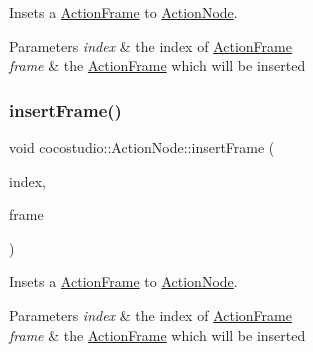 Insets a \hyperlink{classcocostudio_1_1ActionFrame}{Action\+Frame} to \hyperlink{classcocostudio_1_1ActionNode}{Action\+Node}.


\begin{DoxyParams}{Parameters}
{\em index} & the index of \hyperlink{classcocostudio_1_1ActionFrame}{Action\+Frame}\\
\hline
{\em frame} & the \hyperlink{classcocostudio_1_1ActionFrame}{Action\+Frame} which will be inserted \\
\hline
\end{DoxyParams}
\mbox{\label{classcocostudio_1_1ActionNode_a878d16c3aee4203fddf6891f90f9bc8d}} 
\subsubsection{\texorpdfstring{insert\+Frame()}{insertFrame()}\hspace{0.1cm}{\footnotesize\ttfamily [2/2]}}
{\footnotesize\ttfamily void cocostudio\+::\+Action\+Node\+::insert\+Frame (\begin{DoxyParamCaption}\item[{int}]{index,  }\item[{\hyperlink{classcocostudio_1_1ActionFrame}{Action\+Frame} $\ast$}]{frame }\end{DoxyParamCaption})}

Insets a \hyperlink{classcocostudio_1_1ActionFrame}{Action\+Frame} to \hyperlink{classcocostudio_1_1ActionNode}{Action\+Node}.


\begin{DoxyParams}{Parameters}
{\em index} & the index of \hyperlink{classcocostudio_1_1ActionFrame}{Action\+Frame}\\
\hline
{\em frame} & the \hyperlink{classcocostudio_1_1ActionFrame}{Action\+Frame} which will be inserted \\
\hline
\end{DoxyParams}
\mbox{\label{classcocostudio_1_1ActionNode_afbb69bec168ed021dd7e85894cb6f8df}} 
